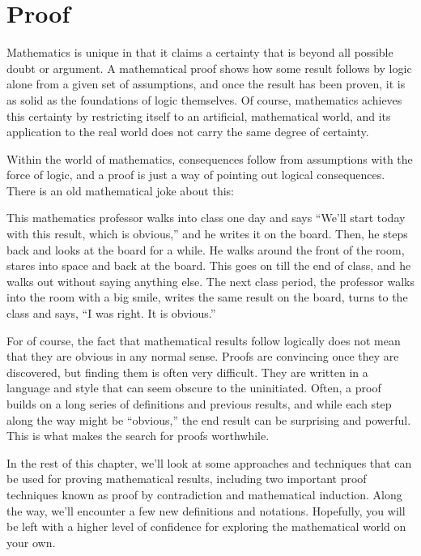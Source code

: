 \section{Proof}\label{S-proof}
Mathematics is unique in that it claims a certainty
that is beyond all possible doubt or argument.  A mathematical proof
shows how some result follows by logic alone from a given set of
assumptions, and once the result has been proven, it is as solid as
the foundations of logic themselves.
Of course, mathematics achieves this certainty by restricting itself
to an artificial, mathematical world, and its application to the
real world does not carry the same degree of certainty.

Within the world of mathematics, consequences follow from assumptions
with the force of logic, and a proof is just a way of pointing out
logical consequences.  There is an old mathematical joke about this:

This mathematics professor walks into class one day and says
``We'll start today with this result, which is obvious,'' and
he writes it on the board.  Then, he steps back and looks at the
board for a while.  He walks around the front of the room, stares
into space and back at the board.  This goes on till the end of
class, and he walks out without saying anything else.  The next
class period, the professor walks into the room with a big smile,
writes the same result on the board, turns to the class and
says, ``I was right.  It is obvious.''

For of course, the fact that mathematical results follow logically
does not mean that they are obvious in any normal sense.  Proofs are
convincing once they are discovered, but finding them is often
very difficult.  They are written in a language and style
that can seem obscure to the uninitiated.
Often, a proof builds on a long series of definitions
and previous results, and while each step along the way might be
``obvious,'' the end result can be surprising and powerful.
This is what makes the search for proofs worthwhile.

In the rest of this chapter, we'll look at some approaches and techniques
that can be used for proving mathematical results, including two
important proof techniques known as proof by contradiction and
mathematical induction.  Along the way, we'll encounter a few new
definitions and notations.  Hopefully, you will be left with
a higher level of confidence for exploring the mathematical world
on your own.

\medskip

